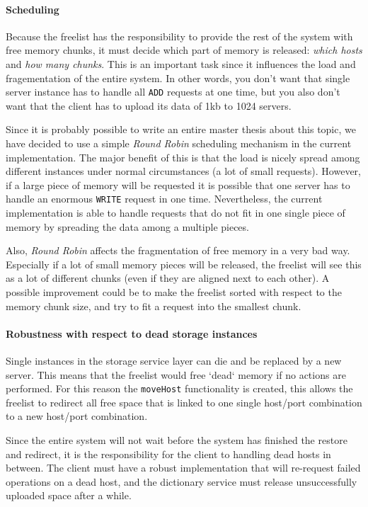 \documentclass[12pt,a4paper]{scrartcl}
\begin{document}
\paragraph{Scheduling}
\label{sec:scheduling}
Because the freelist has the responsibility to provide the rest of the system with free memory chunks, it must decide which part of memory is released: \emph{which hosts} and \emph{how many chunks}. This is an important task since it influences the load and fragementation of the entire system. In other words, you don't want that single server instance has to handle all \verb|ADD| requests at one time, but you also don't want that the client has to upload its data of 1kb to 1024 servers.

Since it is probably possible to write an entire master thesis about this topic, we have decided to use a simple \emph{Round Robin} scheduling mechanism in the current implementation. The major benefit of this is that the load is nicely spread among different instances under normal circumstances (a lot of small requests). However, if a large piece of memory will be requested it is possible that one server has to handle an enormous \verb|WRITE| request in one time. Nevertheless, the current implementation is able to handle requests that do not fit in one single piece of memory by spreading the data among a multiple pieces.

Also, \emph{Round Robin} affects the fragmentation of free memory in a very bad way. Especially if a lot of small memory pieces will be released, the freelist will see this as a lot of different chunks (even if they are aligned next to each other). A possible improvement could be to make the freelist sorted with respect to the memory chunk size, and try to fit a request into the smallest chunk.

\paragraph{Robustness with respect to dead storage instances}
Single instances in the storage service layer can die and be replaced by a new server. This means that the freelist would free `dead` memory if no actions are performed. For this reason the \verb|moveHost| functionality is created, this allows the freelist to redirect all free space that is linked to one single host/port combination to a new host/port combination.

Since the entire system will not wait before the system has finished the restore and redirect, it is the responsibility for the client to handling dead hosts in between. The client must have a robust implementation that will re-request failed operations on a dead host, and the dictionary service must release unsuccessfully uploaded space after a while.
\end{document}
